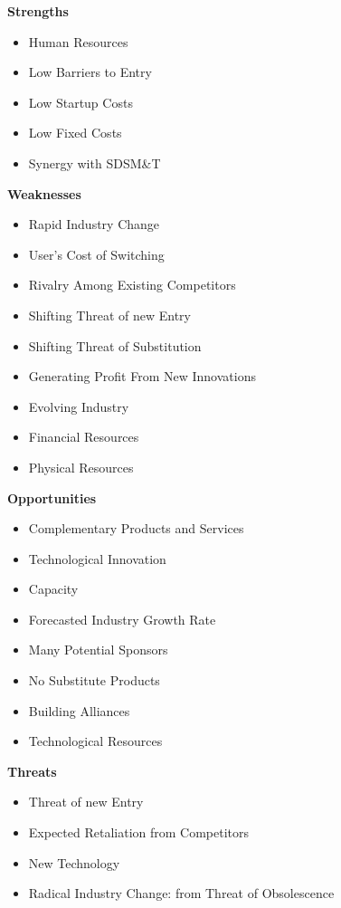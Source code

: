 \textbf{Strengths}
\begin{itemize}
	\item Human Resources
	\item Low Barriers to Entry
	\item Low Startup Costs
	\item Low Fixed Costs
	\item Synergy with SDSM\&T
\end{itemize}
\textbf{Weaknesses}
\begin{itemize}
	\item Rapid Industry Change
	\item User's Cost of Switching
	\item Rivalry Among Existing Competitors
	\item Shifting Threat of new Entry
	\item Shifting Threat of Substitution
	\item Generating Profit From New Innovations
	\item Evolving Industry
	\item Financial Resources
	\item Physical Resources
\end{itemize}
\textbf{Opportunities}
\begin{itemize}
	\item Complementary Products and Services
	\item Technological Innovation
	\item Capacity
	\item Forecasted Industry Growth Rate
	\item Many Potential Sponsors
	\item No Substitute Products 
	\item Building Alliances
	\item Technological Resources
\end{itemize}


\textbf{Threats}
\begin{itemize}
	\item Threat of new Entry
	\item Expected Retaliation from Competitors
	\item New Technology
	\item Radical Industry Change: from Threat of Obsolescence
\end{itemize}